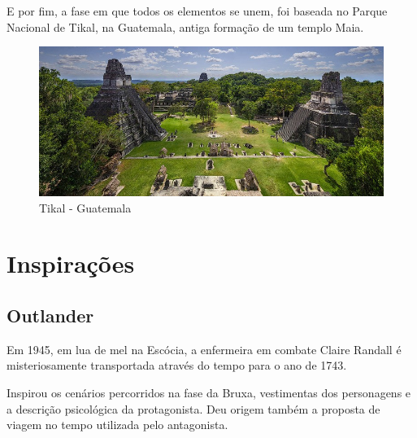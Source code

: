 E por fim, a fase em que todos os elementos se unem, foi baseada no Parque Nacional de Tikal, na Guatemala, antiga formação de um templo Maia.


\begin{figure}[htb]
    \caption{\label{fig_mundoHub}Tikal - Guatemala}
    \begin{center}
        \includegraphics[width=\textwidth]{imagens/tikal.jpg}
    \end{center}
\end{figure}

\clearpage

\section{Inspirações}


\subsection{Outlander}

Em 1945, em lua de mel na Escócia, a enfermeira em combate Claire Randall é misteriosamente transportada através do tempo para o ano de 1743.

Inspirou os cenários percorridos na fase da Bruxa, vestimentas dos personagens e a descrição psicológica da protagonista. Deu origem também a proposta de viagem no tempo utilizada pelo antagonista.

